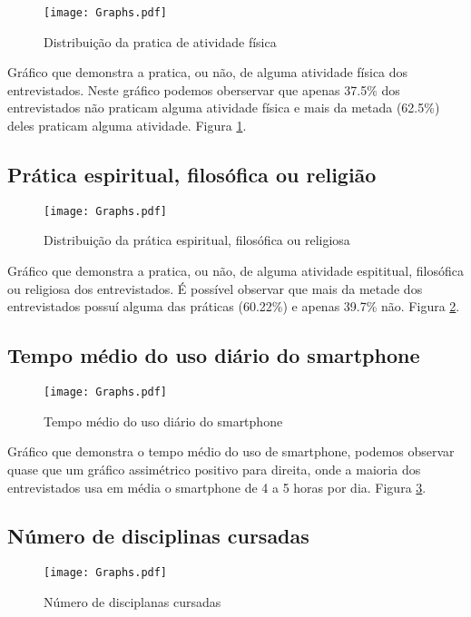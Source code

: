 \documentclass[11pt]{scrartcl} %
\begin{document}
\begin{figure}[h]
  \centering
  \texttt{[image: Graphs.pdf]}
  \label{fig:graph4}
  \caption{Distribuição da pratica de atividade física}
\end{figure}

Gráfico que demonstra a pratica, ou não, de alguma atividade física dos entrevistados. Neste gráfico podemos oberservar que apenas 37.5\% dos entrevistados não praticam alguma atividade física e mais da metada (62.5\%) deles praticam alguma atividade. Figura \ref{fig:graph4}.

\subsection{Prática espiritual, filosófica ou religião}

\begin{figure}[h]
  \centering
  \texttt{[image: Graphs.pdf]}
  \label{fig:graph5}
  \caption{Distribuição da prática espiritual, filosófica ou religiosa}
\end{figure}

Gráfico que demonstra a pratica, ou não, de alguma atividade espititual, filosófica ou religiosa dos entrevistados. É possível observar que mais da metade dos entrevistados possuí alguma das práticas (60.22\%) e apenas 39.7\% não. Figura \ref{fig:graph5}.

\subsection{Tempo médio do uso diário do smartphone}

\begin{figure}[h]
  \centering
  \texttt{[image: Graphs.pdf]}
  \label{fig:graph6}
  \caption{Tempo médio do uso diário do smartphone}
\end{figure}

Gráfico que demonstra o tempo médio do uso de smartphone, podemos observar quase que um gráfico assimétrico positivo para direita, onde a maioria dos entrevistados usa em média o smartphone de 4 a 5 horas por dia. Figura \ref{fig:graph6}.

\subsection{Número de disciplinas cursadas}

\begin{figure}[h]
  \centering
  \texttt{[image: Graphs.pdf]}
  \label{fig:graph7}
  \caption{Número de disciplanas cursadas}
\end{figure}
\end{document}
